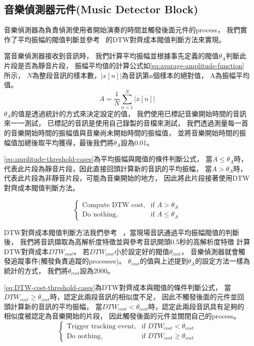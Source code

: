 \documentclass[class=NCU_thesis, crop=false]{standalone}
\begin{document}
\subsection{音樂偵測器元件(Music Detector Block)} \label{ch3-subst-music-detector}
音樂偵測器為負責偵測使用者開始演奏的時間並觸發後面元件的process，
我們實作了平均振幅的閥值判斷並參考~\cite{Lin2020AHumanComputerDuetSystem}
的DTW對齊成本閥值判斷方法來實現。

當音樂偵測器接收到音訊時，
我們計算平均振幅並根據事先定義的閥值$\theta _{A}$判斷此片段是否為靜音片段，
振幅平均值的計算公式如\cref{eq:avarage-amplitude-function}所示，
$N$為整段音訊的樣本數，$| x[n] \vert$為音訊第n個樣本的絕對值，
A為振幅平均值。
\begin{equation}
    \label{eq:avarage-amplitude-function}
    A = \frac{1}{N} \sum _{n=1}^{N} | x[n] \vert 
\end{equation}
$\theta _{A}$的值是透過統計的方式來決定設定的值，
我們使用已標記音樂開始時間的音訊來一一測試，
已標記的音訊是使用自己錄製的音檔來測試，
我們透過測量每一首的音樂開始時間的振幅值與音樂尚未開始時間的振幅值，
並將音樂開始時間的振幅值加總後取平均獲得，最後我們將$\theta _{A}$設為0.01。

\cref{eq:amplitude-threshold-cases}為平均振幅與閥值的條件判斷公式，
當$A \leq \theta _{A}$時，代表此片段為靜音片段，因此直接回頭計算新的音訊的平均振幅，
當$A > \theta _{A}$時，代表此片段為非靜音片段，可能為音樂開始的地方，
因此將此片段接著使用DTW對齊成本閥值判斷方法。

\begin{equation} 
    \label{eq:amplitude-threshold-cases}
    \begin{cases}
        \text{Compute DTW cost}, & \text{if $A > \theta _{A}$} \\
        \text{Do nothing},  & \text{if $A \leq \theta _{A}$}
    \end{cases}
\end{equation}

DTW對齊成本閥值判斷方法我們參考~\cite{Lin2020AHumanComputerDuetSystem}
，當現場音訊通過平均振幅閥值的判斷後，
我們將音訊擷取為高解析度特徵並與參考音訊開頭0.5秒的高解析度特徵
計算DTW對齊成本${DTW_{cost}}$。
若${DTW_{cost}}$小於設定好的閥值$\theta _{cost}$，
音樂偵測器就會觸發追蹤事件(觸發負責追蹤的processes)。
$\theta _{cost}$的值與上述提到$\theta _{A}$的設定方法一樣為統計的方式，
我們將$\theta _{cost}$設為2000。

\cref{eq:DTW-cost-threshold-cases}為DTW對齊成本與閥值的條件判斷公式，
當$DTW_{cost} \geq \theta _{cost}$時，認定此兩段音訊的相似度不足，
因此不觸發後面的元件並回頭計算新的音訊的平均振幅，
當$DTW_{cost}  < \theta _{cost}$時，認定此兩段音訊具有足夠的相似度被認定為音樂開始的片段，
因此觸發後面的元件並關閉自己的process。
\begin{equation}
    \label{eq:DTW-cost-threshold-cases}
    \begin{cases}
        \text{Trigger tracking event}, & \text{if $DTW_{cost} < \theta _{cost}$} \\
        \text{Do nothing}, & \text{if $DTW_{cost} \geq \theta _{cost}$}
    \end{cases}
\end{equation}
\end{document}
